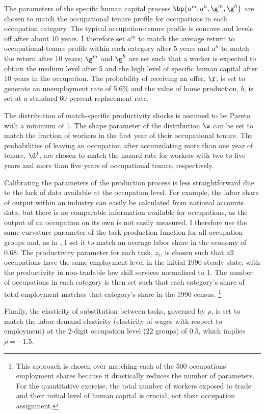 \documentclass[12pt]{article}
\newcommand{\CiteReference}{../reference.bib}
\theoremstyle{definition}
\begin{document}
The parameters of the specific human capital process $\bp{a^m, a^h, \g^m, \g^h}$ are chosen to match the occupational tenure profile for occupations in each occupation category. The typical occupation-tenure profile is concave and levels off after about 10 years. I therefore set $a^m$ to match the average return to occupational-tenure profile within each category after 5 years and $a^h$ to match the return after 10 years; $\g^m$ and $\g^h$ are set such that a worker is expected to obtain the medium level after 5 and the high level of specific human capital after 10 years in the occupation. The probability of receiving an offer, $\f$, is set to generate an unemployment rate of 5.6\% and the value of home production, $b$, is set at a standard 60 percent replacement rate. 

The distribution of match-specific productivity shocks is assumed to be Pareto with a minimum of 1. The shape parameter of the distribution $\s$ can be set to match the fraction of workers in the first year of their occupational tenure. The probabilities of leaving an occupation after accumulating more than one year of tenure, $\d^j$, are chosen to match the hazard rate for workers with two to five years and more than five years of occupational tenure, respectively. 

Calibrating the parameters of the production process is less straightforward due to the lack of data available at the occupation level. For example, the labor share of output within an industry can easily be calculated from national accounts data, but there is no comparable information available for occupations, as the output of an occupation on its own is not easily measured. I therefore use the same curvature parameter of the task production function for all occupation groups and, as in \citet{kambourovOccupationalMobilityWage2009}, I set it to match an average labor share in the economy of 0.68. The productivity parameter for each task, $z_i$, is chosen such that all occupations have the same employment level in the initial 1990 steady state, with the productivity in non-tradable low skill services normalized to 1. The number of occupations in each category is then set such that each category's share of total employment matches that category's share in the 1990 census. \footnote{This approach is chosen over matching each of the 500 occupations' employment shares because it drastically reduces the number of parameters. For the quantitative exercise, the total number of workers exposed to trade and their initial level of human capital is crucial, not their occupation assignment.}

Finally, the elasticity of substitution between tasks, governed by $\rho$, is set to match the labor demand elasticity (elasticity of wages with respect to employment) at the 2-digit occupation level (22 groups) of 0.5, which implies $\rho = -1.5$. 







\end{document}
